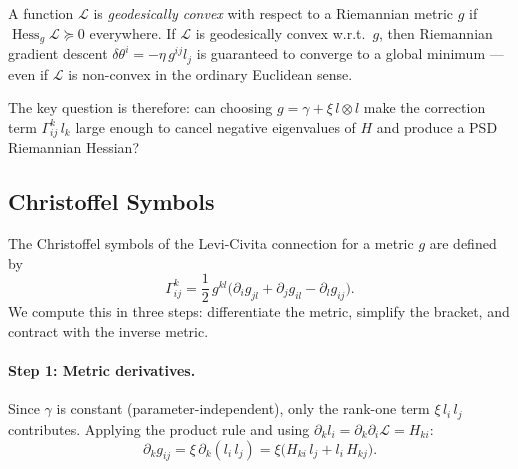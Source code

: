 \documentclass{article}
\newcommand{\loss}{\mathcal{L}}
\begin{document}
\begin{tcolorbox}[colback=gray!8, colframe=gray!22, breakable,
  title=\textbf{Geodesic Convexity}, coltitle=black]
A function $\loss$ is \emph{geodesically convex} with respect to
a Riemannian metric $g$ if
$\operatorname{Hess}_g\loss \succeq 0$ everywhere.
If $\loss$ is geodesically convex w.r.t.\ $g$, then Riemannian
gradient descent
$\delta\theta^i = -\eta\,g^{ij}l_j$
is guaranteed to converge to a global minimum ---
even if $\loss$ is non-convex in the ordinary Euclidean sense.
\end{tcolorbox}

\noindent
The key question is therefore: can choosing $g = \gamma + \xi\,l\otimes l$
make the correction term $\Gamma^k_{ij}\,l_k$ large enough to
cancel negative eigenvalues of $H$ and produce a PSD Riemannian Hessian?

\subsection{Christoffel Symbols}\label{sec:christoffel}

The Christoffel symbols of the Levi-Civita connection
for a metric $g$ are defined by
\begin{equation}\label{eq:christoffel}
    \Gamma^k_{ij}
    = \frac{1}{2}\,g^{kl}\bigl(
        \partial_i g_{jl} + \partial_j g_{il} - \partial_l g_{ij}
      \bigr).
\end{equation}
We compute this in three steps: differentiate the metric,
simplify the bracket, and contract with the inverse metric.

\paragraph{Step 1: Metric derivatives.}
Since $\gamma$ is constant (parameter-independent), only the rank-one term
$\xi\,l_i\,l_j$ contributes.
Applying the product rule and using
$\partial_k l_i = \partial_k\partial_i\loss = H_{ki}$:
\begin{equation}\label{eq:dg}
    \partial_k g_{ij}
    = \xi\,\partial_k(l_i\,l_j)
    = \xi\bigl(H_{ki}\,l_j + l_i\,H_{kj}\bigr).
\end{equation}
\end{document}
